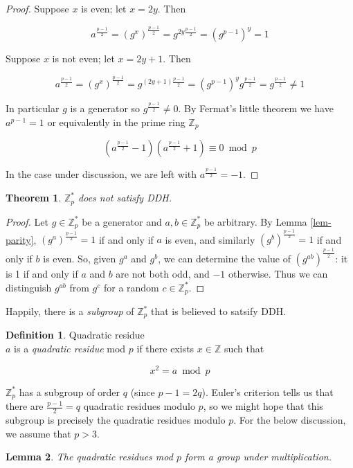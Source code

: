 \documentclass[11pt,twoside,a4paper]{article}
\newtheorem{theorem}{Theorem}[section]
\newtheorem{lemma}[theorem]{Lemma}
\theoremstyle{definition}
\newtheorem{definition}{Definition}[section]
\begin{document}
\begin{proof}
    Suppose \(x\) is even; let \(x=2y\). Then

    \[a^{\frac{p-1}{2}}=(g^x)^{\frac{p-1}{2}}=g^{2y\frac{p-1}{2}}=(g^{p-1})^y=1\]

    Suppose \(x\) is not even; let \(x=2y+1\). Then

    \[a^{\frac{p-1}{2}}=(g^x)^{\frac{p-1}{2}}=g^{(2y+1)\frac{p-1}{2}}=(g^{p-1})^yg^{\frac{p-1}{2}}=g^{\frac{p-1}{2}}\neq 1\]

    In particular \(g\) is a generator so \(g^\frac{p-1}{2}\neq 0\). By Fermat's little theorem we have \(a^{p-1}=1\) or equivalently in the prime ring \(\mathbb{Z}_p\)

    \[\left(a^\frac{p-1}{2}-1\right)\left(a^\frac{p-1}{2}+1\right)\equiv 0\bmod p\]
    
    In the case under discussion, we are left with \(a^\frac{p-1}{2}=-1\).
\end{proof}
\begin{theorem}
    \(\mathbb{Z}^*_p\) does not satisfy DDH.
\end{theorem}
\begin{proof}
    Let \(g\in\mathbb{Z}^*_p\) be a generator and \(a,b\in\mathbb{Z}^*_p\) be arbitrary. By Lemma \ref{lem-parity}, \((g^a)^{\frac{p-1}{2}}=1\) if and only if \(a\) is even, and similarly \((g^b)^{\frac{p-1}{2}}=1\) if and only if \(b\) is even. So, given \(g^a\) and \(g^b\), we can determine the value of \(\left(g^{ab}\right)^\frac{p-1}{2}\): it is 1 if and only if \(a\) and \(b\) are not both odd, and \(-1\) otherwise. Thus we can distinguish \(g^{ab}\) from \(g^c\) for a random \(c\in\mathbb{Z}^*_p\).
\end{proof}
Happily, there is a \textit{subgroup} of \(\mathbb{Z}^*_p\) that is believed to satsify DDH.
\begin{definition}{Quadratic residue}\\
    \(a\) is a \textit{quadratic residue} mod \(p\) if there exists \(x\in\mathbb{Z}\) such that

    \[x^2=a\bmod p\]

\end{definition}
\(\mathbb{Z}^*_p\) has a subgroup of order \(q\) (since \(p-1=2q\)). Euler's criterion tells us that there are \(\frac{p-1}{2}=q\) quadratic residues modulo \(p\), so we might hope that this subgroup is precisely the quadratic residues modulo \(p\). For the below discussion, we assume that \(p>3\).
\begin{lemma}
    The quadratic residues mod \(p\) form a group under multiplication.
\end{lemma}
\end{document}
